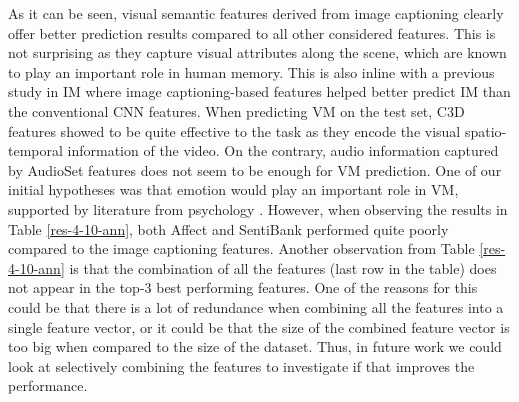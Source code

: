 \documentclass[sigconf]{acmart}
\begin{document}
As it can be seen, visual semantic features derived from image captioning clearly offer better prediction results compared to all other considered features. This is not surprising as they capture visual attributes along the scene, which are known to play an important role in human memory. This is also inline with a previous study in IM \cite{squalli_2017_deep} where image captioning-based features helped better predict IM than the conventional CNN features. %
When predicting VM on the test set, C3D features showed to be quite effective to the task as they encode the visual spatio-temporal information of the video. On the contrary, audio information captured by AudioSet features does not seem to be enough for VM prediction. One of our initial hypotheses was that emotion would play an important role in VM, supported by literature from psychology \cite{emo-mem}.
However, when observing the results in Table \ref{res-4-10-ann}, both Affect \cite{affect} and SentiBank \cite{sb-feat} performed quite poorly compared to the image captioning features.
Another observation from Table \ref{res-4-10-ann} is that the combination of all the features (last row in the table) does not appear in the top-3 best performing features. One of the reasons for this could be that there is a lot of redundance when combining all the features into a single feature vector, or it could be that the size of the combined feature vector is too big when compared to the size of the dataset. Thus, in future work we could look at selectively combining the features to investigate if that improves the performance. 
\end{document}
